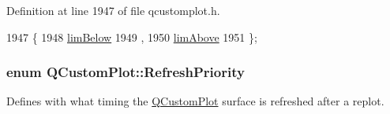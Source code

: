 Definition at line 1947 of file qcustomplot.\+h.


\begin{DoxyCode}
1947                        \{
1948     \hyperlink{class_q_custom_plot_a75a8afbe6ef333b1f3d47abb25b9add7aee39cf650cd24e68552da0b697ce4a93}{limBelow} 
1949     ,
1950     \hyperlink{class_q_custom_plot_a75a8afbe6ef333b1f3d47abb25b9add7a062b0b7825650b432a713c0df6742d41}{limAbove} 
1951   \};
\end{DoxyCode}
\hypertarget{class_q_custom_plot_a45d61392d13042e712a956d27762aa39}{}
\subsubsection[{Refresh\+Priority}]{\setlength{\rightskip}{0pt plus 5cm}enum {\bf Q\+Custom\+Plot\+::\+Refresh\+Priority}}\label{class_q_custom_plot_a45d61392d13042e712a956d27762aa39}
Defines with what timing the \hyperlink{class_q_custom_plot}{Q\+Custom\+Plot} surface is refreshed after a replot.

